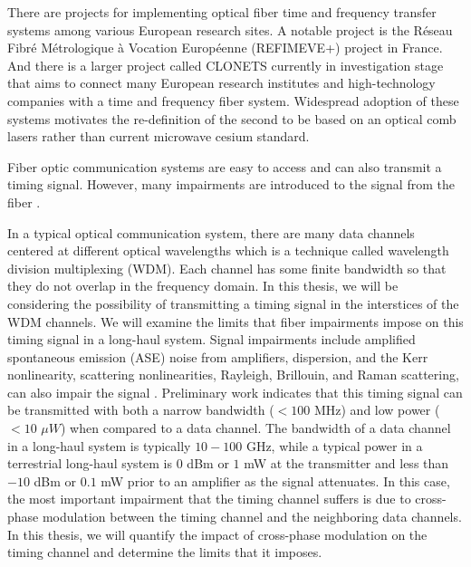 There are projects for implementing optical fiber time and frequency transfer systems among various European research sites.  A notable project is the R\'eseau Fibr\'e M\'etrologique \`a Vocation Europ\'eenne (REFIMEVE+) project in France. And there is a larger project called CLONETS currently in investigation stage that aims to connect many European research institutes and high-technology companies with a time and frequency fiber system.  Widespread adoption of these systems motivates the re-definition of the second to be based on an optical comb lasers rather than current microwave cesium standard.
  

Fiber optic communication systems are easy to access and can also transmit a timing signal. However, many impairments are introduced to the signal from the fiber \cite{agrawal2012fiber}.  

In a typical optical communication system, there are many data channels centered at different optical wavelengths which is a technique called wavelength division multiplexing (WDM).  Each channel has some finite bandwidth so that they do not overlap in the frequency domain.  In this thesis, we will be considering the possibility of transmitting a timing signal in the interstices of the WDM channels.  We will examine the limits that fiber impairments impose on this timing signal in a long-haul system.  Signal impairments include amplified spontaneous emission (ASE) noise from amplifiers, dispersion, and the Kerr nonlinearity, scattering nonlinearities, Rayleigh, Brillouin, and Raman scattering, can also impair the signal \cite{agrawal2012fiber}\cite{agrawal1995nonlinear}.  Preliminary work indicates that this timing signal can be transmitted with both a narrow bandwidth ($< 100$ MHz) and low power ($<10$ $\mu W$) when compared to a data channel.  The bandwidth of a data channel in a long-haul system is typically $10-100$ GHz, while a typical power in a terrestrial long-haul system is $0$ dBm or $1$ mW at the transmitter and less than $-10$ dBm or $0.1$ mW prior to an amplifier as the signal attenuates.  In this case, the most important impairment that the timing channel suffers is due to cross-phase modulation between the timing channel and the neighboring data channels.  In this thesis, we will quantify the impact of cross-phase modulation on the timing channel and determine the limits that it imposes.


